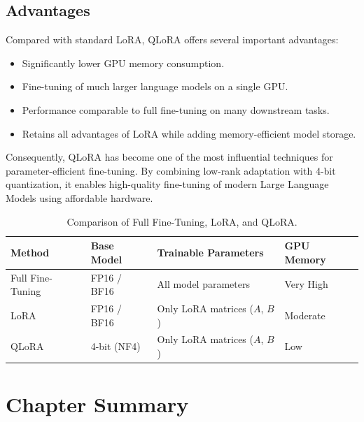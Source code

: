\subsection*{Advantages}

Compared with standard LoRA, QLoRA offers several important advantages:

\begin{itemize}
    \item Significantly lower GPU memory consumption.
    \item Fine-tuning of much larger language models on a single GPU.
    \item Performance comparable to full fine-tuning on many downstream tasks.
    \item Retains all advantages of LoRA while adding memory-efficient model storage.
\end{itemize}

Consequently, QLoRA has become one of the most influential techniques for parameter-efficient fine-tuning. By combining low-rank adaptation with 4-bit quantization, it enables high-quality fine-tuning of modern Large Language Models using affordable hardware.
\begin{table}[H]
\centering
\caption{Comparison of Full Fine-Tuning, LoRA, and QLoRA.}
\label{tab:ft_lora_qlora}

\renewcommand{\arraystretch}{1.35}

\begin{tabular}{|p{3.5cm}|p{2.8cm}|p{3.0cm}|p{2.6cm}|}
\hline
\rowcolor{gray!15}
\textbf{Method} &
\textbf{Base Model} &
\textbf{Trainable Parameters} &
\textbf{GPU Memory} \\
\hline

Full Fine-Tuning &
FP16 / BF16 &
All model parameters &
Very High \\
\hline

LoRA &
FP16 / BF16 &
Only LoRA matrices ($A$, $B$) &
Moderate \\
\hline

QLoRA &
4-bit (NF4) &
Only LoRA matrices ($A$, $B$) &
Low \\
\hline

\end{tabular}

\end{table}
\section*{Chapter Summary}

